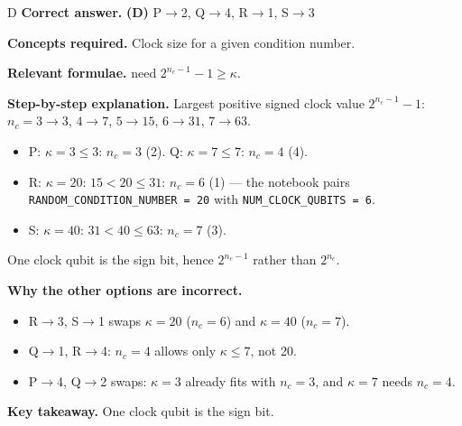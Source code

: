 \documentclass[11pt,a4paper]{article}
\newcommand{\qsep}{\par\vspace{2pt}{\color{black!15}\hrule}\vspace{4pt}}
\begin{document}
\begin{solbox}{D}
\textbf{\color{brand}Correct answer.} \textcolor{okgreen}{\textbf{(D)}} P$\to$2, Q$\to$4, R$\to$1, S$\to$3

\textbf{\color{brand}Concepts required.} Clock size for a given condition number.

\textbf{\color{brand}Relevant formulae.} need $2^{n_c - 1} - 1 \ge \kappa$.

\textbf{\color{brand}Step-by-step explanation.} Largest positive signed clock value $2^{n_c-1} - 1$: $n_c = 3 \to 3$, $4 \to 7$, $5 \to 15$, $6 \to 31$, $7 \to 63$.
\begin{itemize}\itemsep0pt
\item P: $\kappa = 3 \le 3$: $n_c = 3$ (2). \quad Q: $\kappa = 7 \le 7$: $n_c = 4$ (4).
\item R: $\kappa = 20$: $15 < 20 \le 31$: $n_c = 6$ (1) --- the notebook pairs \texttt{RANDOM\_CONDITION\_NUMBER = 20} with \texttt{NUM\_CLOCK\_QUBITS = 6}.
\item S: $\kappa = 40$: $31 < 40 \le 63$: $n_c = 7$ (3).
\end{itemize}
One clock qubit is the sign bit, hence $2^{n_c-1}$ rather than $2^{n_c}$.

\textbf{\color{brand}Why the other options are incorrect.}
\begin{itemize}[leftmargin=2.4em, itemsep=1pt, topsep=2pt]
\item[\textbf{(A)}] R$\to$3, S$\to$1 swaps $\kappa = 20$ ($n_c = 6$) and $\kappa = 40$ ($n_c = 7$).
\item[\textbf{(B)}] Q$\to$1, R$\to$4: $n_c = 4$ allows only $\kappa \le 7$, not 20.
\item[\textbf{(C)}] P$\to$4, Q$\to$2 swaps: $\kappa = 3$ already fits with $n_c = 3$, and $\kappa = 7$ needs $n_c = 4$.
\end{itemize}
\textbf{\color{brand}Key takeaway.} One clock qubit is the sign bit.
\end{solbox}
\qsep
\end{document}

